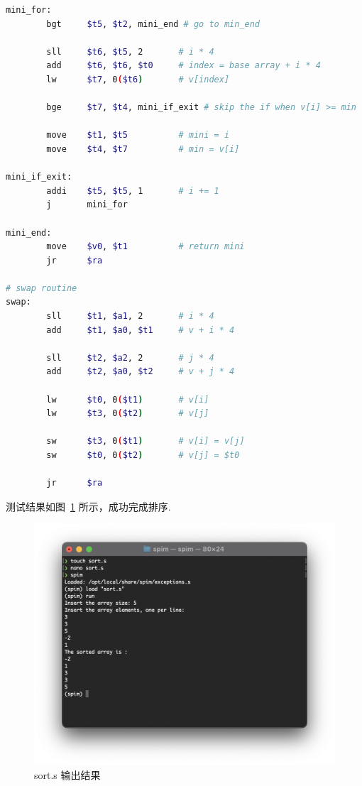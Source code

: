 \documentclass[11pt]{SEU-Digital-Report}
\begin{document}
\begin{lstlisting}[language=sh,tabsize=2,morekeywords={
        j,la,li,syscall,move,sll,sub,bge,sll,add,sw,addi,jal,ls,subu,jr,lw,bgt,bne,lbu,lb,sb
      },title={sort.s}]
mini_for:
        bgt	    $t5, $t2, mini_end # go to min_end

        sll	    $t6, $t5, 2       # i * 4
        add	    $t6, $t6, $t0     # index = base array + i * 4
        lw	    $t7, 0($t6)       # v[index]

        bge	    $t7, $t4, mini_if_exit # skip the if when v[i] >= min
        
        move    $t1, $t5          # mini = i
        move    $t4, $t7          # min = v[i]

mini_if_exit:
        addi    $t5, $t5, 1       # i += 1
        j 	    mini_for

mini_end:
        move    $v0, $t1          # return mini
        jr	    $ra

# swap routine
swap:
        sll	    $t1, $a1, 2       # i * 4
        add	    $t1, $a0, $t1     # v + i * 4
        
        sll	    $t2, $a2, 2       # j * 4
        add	    $t2, $a0, $t2     # v + j * 4
 
        lw	    $t0, 0($t1)       # v[i]
        lw	    $t3, 0($t2)       # v[j]

        sw	    $t3, 0($t1)       # v[i] = v[j]
        sw	    $t0, 0($t2)       # v[j] = $t0

        jr	    $ra
      \end{lstlisting}

      测试结果如图~\ref{fig:terminal_spim_mac} 所示，成功完成排序.

      \begin{figure}[htbp]
        \centering
        \includegraphics[width=.7\linewidth]{fig/spim/terminal_spim_mac.png}
        \vspace{-5mm}
        \caption{sort.s 输出结果}
        \label{fig:terminal_spim_mac}
      \end{figure}
\end{document}
